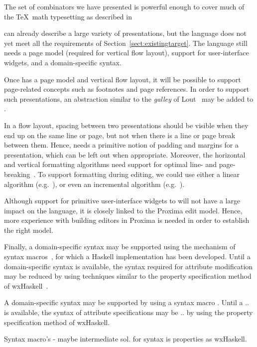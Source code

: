 \bc The set of combinators we have presented is powerful enough to cover much of the \TeX~math typesetting as described in \cite{heckmann97functionalTex} \ec

{\Xprez} can already describe a large variety of presentations, but the language does not yet meet all the requirements of  Section~\ref{sect:existingtarget}. The language still needs a page model (required for vertical flow layout), support for user-interface widgets, and a domain-specific syntax.

Once {\Xprez} has a page model and vertical flow layout, it will be possible to support page-related concepts such as footnotes and page references. In order to support such presentations, an abstraction similar to the {\em galley} of Lout~\cite{kingston93lout} may be added to {\Xprez}.

In a flow layout, spacing between two presentations should be visible when they end up on the same line or page, but not when there is a line or page break between them. Hence, {\Xprez} needs a primitive notion of padding and margins for a presentation, which can be left out when appropriate. Moreover, the horizontal and vertical formatting algorithms need support for optimal line- and page-breaking~\cite{knuth82breaking}. To support formatting during editing, we could use either a linear algorithm (e.g.\ \cite{demoor99breaking}), or even an incremental algorithm (e.g.\ \cite{jeuring91breaking}).

Although support for primitive user-interface widgets to {\Xprez} will not have a large impact on the language, it is closely linked to the Proxima edit model. Hence, more experience with building editors in Proxima is needed in order to establish the right model.

Finally, a domain-specific syntax may be supported using the mechanism of syntax macros~\cite{leavenworth66synMacros}, for which a Haskell implementation has been developed. Until a domain-specific syntax is available, the syntax required for attribute modification may be reduced by using techniques similar to the property specification method of wxHaskell~\cite{leijen04wxHaskell}.

\bc A domain-specific syntax may be supported by using a syntax macro . Until a .. is available, the syntax of attribute specifications may be .. by using the property specification method of wxHaskell.
\ec

\bc
\cite{leijen04wxHaskell}
Syntax macro's - maybe intermediate sol. for syntax is properties as wxHaskell.
\ec


